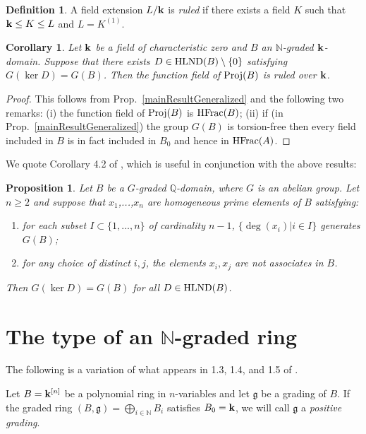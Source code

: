 \documentclass[12pt]{amsart}
\theoremstyle{plain}
\newtheorem{proposition}[subsection]{Proposition}
\newtheorem{corollary}[subsection]{Corollary}
\theoremstyle{definition}
\newtheorem{definition}[subsection]{Definition}
\newcommand{\Proj}{		\operatorname{{\rm Proj}}}
\newcommand{\HFrac}{		\operatorname{{\rm HFrac}}}
\newcommand{\Nat}{\ensuremath{\mathbb{N}}}
\newcommand{\Rat}{\ensuremath{\mathbb{Q}}}
\newcommand{\bk}{{\ensuremath{\rm \bf k}}}
\newcommand{\ggoth}{\mathfrak{g}}
\newcommand{\hlnd}{\operatorname{{\rm HLND}}}
\begin{document}
\begin{definition}
	A field extension $L / \bk$ is \textit{ruled} if there exists a field $K$ such that $\bk \leq K \leq L$ and $L = K^{(1)}$.  
\end{definition}

\begin{corollary} \label{mainResult}
Let $\bk$ be a field of characteristic zero and $B$ an $\Nat$-graded $\bk$-domain.
Suppose that there exists $D \in \hlnd(B) \setminus \{0\}$ satisfying $G( \ker D ) = G(B)$.
Then the function field of $\Proj(B)$ is ruled over $\bk$.
\end{corollary}

\begin{proof}
This follows from Prop.\ \ref{mainResultGeneralized} and the following two remarks:
(i) the function field of $\Proj(B)$ is $\HFrac(B)$;
(ii) if (in Prop.\ \ref{mainResultGeneralized}) the group $G(B)$ is torsion-free then every field included in $B$ is in fact included in $B_0$
and hence in $\HFrac(A)$.
\end{proof}


We quote Corollary 4.2 of \cite{daigle:hal-01691491}, which is useful in conjunction with the above results:

\begin{proposition} Let $B$ be a $G$-graded $\Rat$-domain, where $G$ is an abelian group.
Let $n \geq 2$ and suppose that $x_1$,...,$x_n$ are homogeneous prime elements of $B$ satisfying:
\begin{enumerate}

\item[(i)] for each subset $I \subset \{1,...,n\}$ of cardinality $n - 1$, $\{ \deg(x_i) | i \in I\}$ generates $G(B)$;  

\item[(ii)] for any choice of distinct $i,j$, the elements $x_i, x_j$ are not associates in $B$.

\end{enumerate}
Then $G(\ker D) = G(B)$ for all $D  \in \hlnd(B)$.
\end{proposition}


\section{The type of an $\Nat$-graded ring}

The following is a variation of what appears in 1.3, 1.4, and 1.5 of \cite{Daigle2007}.   

Let $B = \bk^{[n]}$ be a polynomial ring in $n$-variables and let $\ggoth$ be a grading of $B$. If the graded ring $(B, \ggoth) = \bigoplus\limits_{i \in \Nat} B_i$ satisfies $B_0 = \bk$, we will call $\ggoth$ a \textit{positive grading}. 
	
\end{document}
